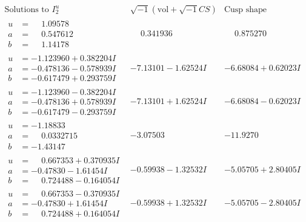 \documentclass[1p]{elsarticle_modified}
\theoremstyle{definition}
\newcommand{\I}{\sqrt{-1}}
\begin{document}
$$\begin{array}{c|c|c}  
\text{Solutions to }I^u_{2}& \I (\text{vol} + \sqrt{-1}CS) & \text{Cusp shape}\\
 \hline 
\begin{aligned}
u &= \phantom{-}1.09578\phantom{ +0.000000I} \\
a &= \phantom{-}0.547612\phantom{ +0.000000I} \\
b &= \phantom{-}1.14178\phantom{ +0.000000I}\end{aligned}
 & \phantom{-}0.341936\phantom{ +0.000000I} & \phantom{-}0.875270\phantom{ +0.000000I} \\ \hline\begin{aligned}
u &= -1.123960 + 0.382204 I \\
a &= -0.478136 - 0.578939 I \\
b &= -0.617479 + 0.293759 I\end{aligned}
 & -7.13101 - 1.62524 I & -6.68084 + 0.62023 I \\ \hline\begin{aligned}
u &= -1.123960 - 0.382204 I \\
a &= -0.478136 + 0.578939 I \\
b &= -0.617479 - 0.293759 I\end{aligned}
 & -7.13101 + 1.62524 I & -6.68084 - 0.62023 I \\ \hline\begin{aligned}
u &= -1.18833\phantom{ +0.000000I} \\
a &= \phantom{-}0.0332715\phantom{ +0.000000I} \\
b &= -1.43147\phantom{ +0.000000I}\end{aligned}
 & -3.07503\phantom{ +0.000000I} & -11.9270\phantom{ +0.000000I} \\ \hline\begin{aligned}
u &= \phantom{-}0.667353 + 0.370935 I \\
a &= -0.47830 - 1.61454 I \\
b &= \phantom{-}0.724488 - 0.164054 I\end{aligned}
 & -0.59938 - 1.32532 I & -5.05705 + 2.80405 I \\ \hline\begin{aligned}
u &= \phantom{-}0.667353 - 0.370935 I \\
a &= -0.47830 + 1.61454 I \\
b &= \phantom{-}0.724488 + 0.164054 I\end{aligned}
 & -0.59938 + 1.32532 I & -5.05705 - 2.80405 I \\ \hline\begin{aligned}

\end{aligned}
\end{array}$$
\end{document}
